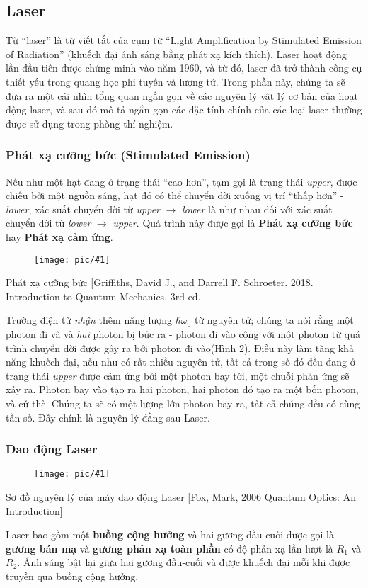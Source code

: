 \documentclass{report}
\newcommand{\image}[1]{
\begin{figure}[H]
	\centering
	\texttt{[image: pic/\#1]}
	\label{#1}
\end{figure}
}
\begin{document}
\subsection{Laser}
Từ ``laser'' là từ viết tắt của cụm từ ``Light Amplification by Stimulated Emission of Radiation'' (khuếch đại ánh sáng bằng phát xạ kích thích). Laser hoạt động lần đầu tiên được chứng minh vào năm 1960, và từ đó, laser đã trở thành công cụ thiết yếu trong quang học phi tuyến và lượng tử. Trong phần này, chúng ta sẽ đưa ra một cái nhìn tổng quan ngắn gọn về các nguyên lý vật lý cơ bản của hoạt động laser, và sau đó mô tả ngắn gọn các đặc tính chính của các loại laser thường được sử dụng trong phòng thí nghiệm.
\subsubsection{Phát xạ cưỡng bức (Stimulated Emission)}
Nếu như một hạt đang ở trạng thái ``cao hơn'', tạm gọi là trạng thái \textit{upper}, được chiếu bởi một nguồn sáng, hạt đó có thể chuyển dời xuống vị trí ``thấp hơn'' - \textit{lower}, xác suất chuyển dời từ \textit{upper} $\rightarrow$ \textit{lower} là như nhau đối với xác suất chuyển dời từ \textit{lower} $\rightarrow$ \textit{upper}. Quá trình này được gọi là \textbf{Phát xạ cưỡng bức} hay \textbf{Phát xạ cảm ứng}.
\image{stimulatedemission.png}{Phát xạ cưỡng bức [Griffiths, David J., and Darrell F. Schroeter. 2018. Introduction to Quantum Mechanics. 3rd ed.]}

Trường điện từ \textit{nhận} thêm năng lượng $\hbar \omega_0$ từ nguyên tử; chúng ta nói rằng một photon đi và và \textit{hai} photon bị bức ra - photon đi vào cộng với một photon từ quá trình chuyển dời được gây ra bởi photon đi vào(Hình 2). Điều này làm tăng khả năng khuếch đại, nếu như có rất nhiều nguyên tử, tất cả trong số đó đều đang ở trạng thái \textit{upper} được cảm ứng bởi một photon bay tới, một chuỗi phản ứng sẽ xảy ra. Photon bay vào tạo ra hai photon, hai photon đó tạo ra một bốn photon, và cứ thế. Chúng ta sẽ có một lượng lớn photon bay ra, tất cả chúng đều có cùng tần số. Đây chính là nguyên lý đằng sau Laser.
\subsubsection{Dao động Laser}
\image{fig4.8.png}{Sơ đồ nguyên lý của máy dao động Laser [Fox, Mark, 2006 Quantum Optics: An Introduction]}

Laser bao gồm một \textbf{buồng cộng hưởng} và hai gương đầu cuối được gọi là \textbf{gương bán mạ} và \textbf{gương phản xạ toàn phần} có độ phản xạ lần lượt là $R_1$ và $R_2$. Ánh sáng bật lại giữa hai gương đầu-cuối và được khuếch đại mỗi khi được truyền qua buồng cộng hưởng.
\end{document}

